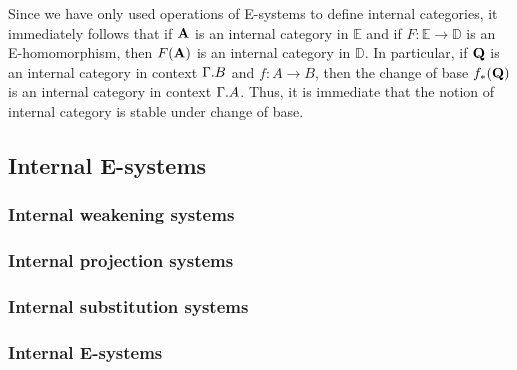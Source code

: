 \begin{rmk}
Since we have only used operations of E-systems to define internal categories,
it immediately follows that if $\mathbf{A}$ is an internal category in
$\mathbb{E}$ and if $F:\mathbb{E}\to\mathbb{D}$ is an E-homomorphism, then
$F(\mathbf{A})$ is an internal category in $\mathbb{D}$. In particular, if
$\mathbf{Q}$ is an internal category in context $\ctxext{\Gamma}{B}$ and
$f:A\to B$, then the change of base $f_\ast(\mathbf{Q})$ is an internal category
in context $\ctxext{\Gamma}{A}$. Thus, it is immediate that the notion of
internal category is stable under change of base.
\end{rmk}

\subsection{Internal E-systems}

\subsubsection{Internal weakening systems}

\subsubsection{Internal projection systems}

\subsubsection{Internal substitution systems}

\subsubsection{Internal E-systems}


